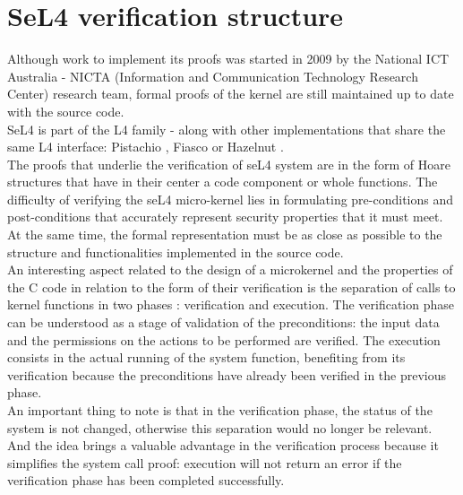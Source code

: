 \documentclass[conference]{IEEEtran}
\begin{document}
\section{SeL4 verification structure}
Although work to implement its proofs was started in 2009 \cite{sel4} by the National ICT Australia - NICTA (Information and Communication Technology Research Center) research team, formal proofs of the kernel are still maintained up to date with the source code.\\
SeL4 is part of the L4 family - along with other implementations that share the same L4 interface: Pistachio \cite{pistachio}, Fiasco \cite{fiasco} or Hazelnut \cite{hazelnut}.\\
The proofs that underlie the verification of seL4 system are in the form of Hoare structures that have in their center a code component or whole functions. The difficulty of verifying the seL4 micro-kernel lies in formulating pre-conditions and post-conditions that accurately represent security properties that it must meet. At the same time, the formal representation must be as close as possible to the structure and functionalities implemented in the source code.\\
An interesting aspect related to the design of a microkernel and the properties of the C code in relation to the form of their verification is the separation of calls to kernel functions in two phases \cite{verifos}: verification and execution. The verification phase can be understood as a stage of validation of the preconditions: the input data and the permissions on the actions to be performed are verified. The execution consists in the actual running of the system function, benefiting from its verification because the preconditions have already been verified in the previous phase. \\
An important thing to note is that in the verification phase, the status of the system is not changed, otherwise this separation would no longer be relevant. And the idea brings a valuable advantage in the verification process because it simplifies the system call proof: execution will not return an error if the verification phase has been completed successfully.
\end{document}
